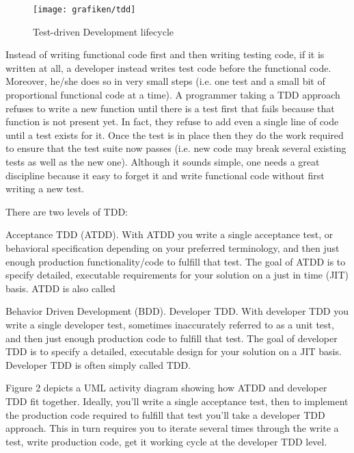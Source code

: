 \begin{figure}[H]
	\centering
    \texttt{[image: grafiken/tdd]}
    \caption[Test-driven Development lifecycle]{Test-driven Development lifecycle\protect\footnotemark}
    \label{fig:tdd}
\end{figure}


Instead of writing functional code first and then writing testing code, if it is written at all, a developer instead writes test code before the functional code. Moreover, he/she does so in very small steps (i.e. one test and a small bit of proportional functional code at a time). A programmer taking a TDD approach refuses to write a new function until there is a test first that fails because that function is not present yet. In fact, they refuse to add even a single line of code until a test exists for it. Once the test is in place then they do the work required to ensure that the test suite now passes (i.e. new code may break several existing tests as well as the new one). Although it sounds simple, one needs a great discipline because it easy to forget it and write functional code without first writing a new test.

There are two levels of TDD:

Acceptance TDD (ATDD).  With ATDD you write a single acceptance test, or behavioral specification depending on your preferred terminology, and then just enough production functionality/code to fulfill that test. The goal of ATDD is to specify detailed, executable requirements for your solution on a just in time (JIT) basis. ATDD is also called 

Behavior Driven Development (BDD).
Developer TDD. With developer TDD you write a single developer test, sometimes inaccurately referred to as a unit test, and then just enough production code to fulfill that test. The goal of developer TDD is to specify a detailed, executable design for your solution on a JIT basis. Developer TDD is often simply called TDD.

Figure 2 depicts a UML activity diagram showing how ATDD and developer TDD fit together.  Ideally, you'll write a single acceptance test, then to implement the production code required to fulfill that test you'll take a developer TDD approach. This in turn requires you to iterate several times through the write a test, write production code, get it working cycle at the developer TDD level.

